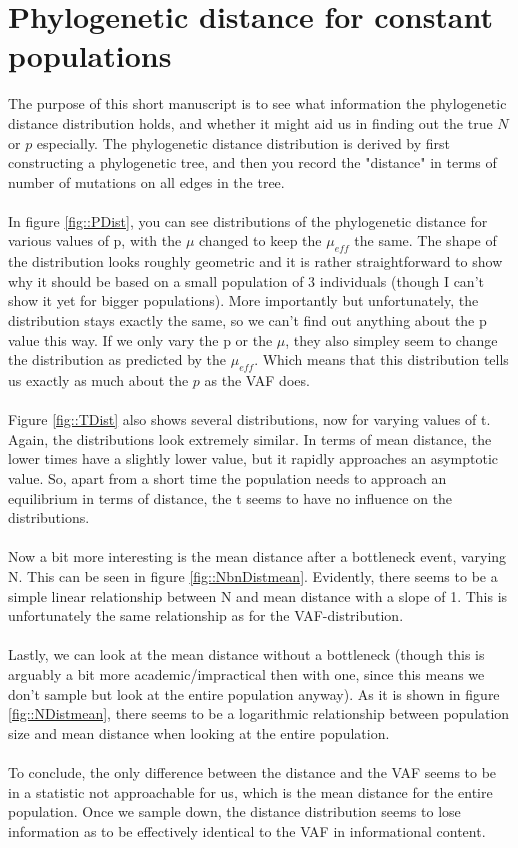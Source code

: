 \documentclass{article}
\numberwithin{equation}{subsection}
\begin{document}
	\section{Phylogenetic distance for constant populations}
	
	The purpose of this short manuscript is to see what information the phylogenetic distance distribution holds, and whether it might aid us in finding out the true $N$ or $p$ especially. The phylogenetic distance distribution is derived by first constructing a phylogenetic tree, and then you record the "distance" in terms of number of mutations on all edges in the tree.\\
	\\
	In figure \ref{fig::PDist}, you can see distributions of the phylogenetic distance for various values of p, with the $\mu$ changed to keep the $\mu_{eff}$ the same. The shape of the distribution looks roughly geometric and it is rather straightforward to show why it should be based on a small population of 3 individuals (though I can't show it yet for bigger populations). More importantly but unfortunately, the distribution stays exactly the same, so we can't find out anything about the p value this way. If we only vary the p or the $\mu$, they also simpley seem to change the distribution as predicted by the $ \mu_{eff}$. Which means that this distribution tells us exactly as much about the $p$ as the VAF does. \\
	\\
	Figure \ref{fig::TDist} also shows several distributions, now for varying values of t. Again, the distributions look extremely similar. In terms of mean distance, the lower times have a slightly lower value, but it rapidly approaches an asymptotic value. So, apart from a short time the population needs to approach an equilibrium in terms of distance, the t seems to have no influence on the distributions.\\
	\\
	Now a bit more interesting is the mean distance after a bottleneck event, varying N. This can be seen in figure  \ref{fig::NbnDistmean}. Evidently, there seems to be a simple linear relationship between N and mean distance with a slope of 1. This is unfortunately the same relationship as for the VAF-distribution.\\
	\\
	Lastly, we can look at the mean distance without a bottleneck (though this is arguably a bit more academic/impractical then with one, since this means we don't sample but look at the entire population anyway). As it is shown in figure \ref{fig::NDistmean}, there seems to be a logarithmic relationship between population size and mean distance when looking at the entire population.\\
	\\
	To conclude, the only difference between the distance and the VAF seems to be in a statistic not approachable for us, which is the mean distance for the entire population. Once we sample down, the distance distribution seems to lose information as to be effectively identical to the VAF in informational content.
	
\end{document}
